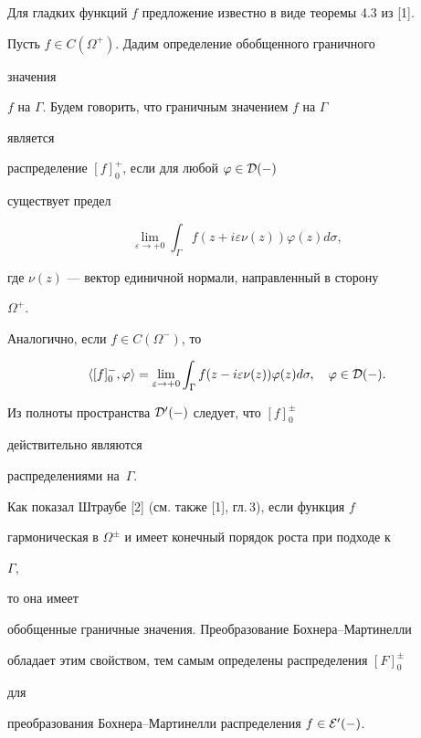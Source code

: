  


Для гладких функций $f$ предложение известно в виде теоремы 4.3 из [1]. 


 


Пусть $f\in C(\Omega^+)$. Дадим определение обобщенного граничного 


значения 


$f$ на $\Gamma$. Будем говорить, что граничным значением $f$ на $\Gamma$ 


является 


распределение $[f]^+_0$, если для любой $\varphi\in\cal D(\Gamma)$ 


существует предел 


$$ 


\lim_{\varepsilon\to+0}\int_\Gamma f(z+i\varepsilon\nu(z)) 


\varphi(z)d\sigma, 


$$ 


где $\nu(z)$ --- вектор единичной нормали, направленный в сторону 


$\Omega^+$. 


Аналогично, если $f\in C(\Omega^-)$, то 


$$ 


\la [f]^-_0,\varphi\ra=\lim_{\varepsilon\to+0}\int_\Gamma 


f(z-i\varepsilon\nu(z))\varphi(z)d\sigma,\quad 


\varphi\in\cal D(\Gamma). 


$$ 


Из полноты пространства $\cal D'(\Gamma)$ следует, что $[f]^\pm_0$ 


действительно являются 


распределениями на~$\Gamma$. 


 


Как показал Штраубе [2] (см. также [1], гл.\,3), если функция $f$ 


гармоническая в $\Omega^\pm$ и имеет конечный порядок роста при подходе к 


$\Gamma$, 


то она имеет 


обобщенные граничные значения. Преобразование Бохнера--Мартинелли 


обладает этим свойством, тем самым определены распределения $[F]^\pm_0$ 


для 


преобразования Бохнера--Мартинелли распределения $f\in\cal E'(\Gamma)$. 


